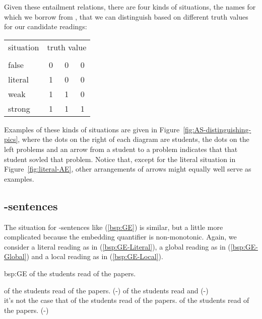 \documentclass[fleqn,reqno,10pt,draft]{article}
\newcommand{\lit}{\acro{lit}}
\newcommand{\glb}{\acro{glb}}
\newcommand{\loc}{\acro{loc}}
\renewcommand{\es}{\acro{es}}
\newcommand{\mymark}[1]{{\color{mycol}{#1}}}
\begin{document}
Given these entailment relations, there are four kinds of situations,
the names for which we borrow from
\citet{ChemlaSpector2010:Experimental-Ev}, that we can distinguish
based on different truth values for our candidate readings:

\begin{center}
  \begin{tabular}{lccc}
    \toprule
    situation    & \multicolumn{3}{c}{truth value} 
  \\ 
  \cmidrule(r){2-4}
     & \lit & \glb & \loc \\ \midrule
    false   & 0 & 0 & 0 \\
    literal & 1 & 0 & 0 \\
    weak    & 1 & 1 & 0 \\
    strong  & 1 & 1 & 1 \\ \bottomrule
  \end{tabular}
\end{center}

\noindent Examples of these kinds of situations are given in
Figure~\ref{fig:AS-distinguishing-pics}, where the dots on the right
of each diagram are students, the dots on the left problems and an
arrow from a student to a problem indicates that that student sovled
that problem. Notice that, except for the literal
situation in
Figure~\ref{fig:literal-AE},
other arrangements of arrows might equally well serve as examples.

\subsection{\es-sentences}
\label{sec:es-sentences}

The situation for \es-sentences like (\ref{bsp:GE}) is similar, but a
little more complicated because the embedding quantifier is
non-monotonic. Again, we consider a literal reading as in
(\ref{bsp:GE-Literal}), a global reading as in (\ref{bsp:GE-Global})
and a local reading as in (\ref{bsp:GE-Local}).

\begin{exer}{bsp:GE}
\ex \mymark{Exactly one} of the students read {\mymark{some}} of the
  papers.

  \begin{xlist}
  \ex \mymark{Exactly one} of the students read
    {\mymark{some and maybe all}} of the papers. \hfill (\es-\lit)
  \ex 
    \mymark{Exactly one} of the students read \mymark{some and maybe all} 
    and  \hfill (\es-\glb)\\
    it's not the case that \mymark{exactly one} of the students read \mymark{all} of the papers.
  \ex 
    \mymark{Exactly one} of the students read {\mymark{some  but not all}} of the
    papers. \hfill (\es-\loc)
  \end{xlist}
\end{exer}
\end{document}
